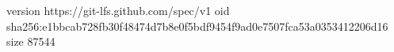 version https://git-lfs.github.com/spec/v1
oid sha256:e1bbcab728fb30f48474d7b8e0f5bdf9454f9ad0e7507fca53a0353412206d16
size 87544
